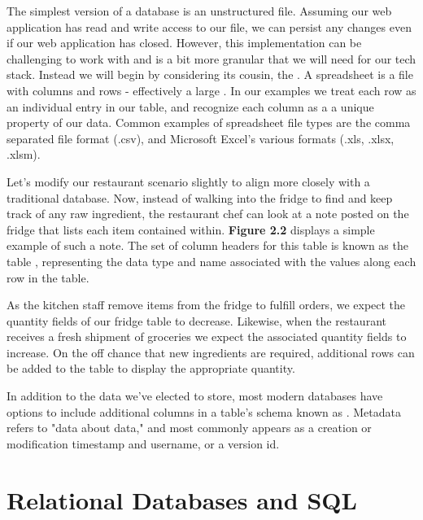 The simplest version of a database is an unstructured file. Assuming our web application has read and write access to our file, we can persist any changes even if our web application has closed. However, this implementation can be challenging to work with and is a bit more granular that we will need for our tech stack. Instead we will begin by considering its cousin, the . A spreadsheet is a file with columns and rows - effectively a large . In our examples we treat each row as an individual entry in our table, and recognize each column as a a unique property of our data. Common examples of spreadsheet file types are the comma separated file format (.csv), and Microsoft Excel's various formats (.xls, .xlsx, .xlsm).


Let's modify our restaurant scenario slightly to align more closely with a traditional database. Now, instead of walking into the fridge to find and keep track of any raw ingredient, the restaurant chef can look at a note posted on the fridge that lists each item contained within. \textbf{Figure 2.2} displays a simple example of such a note. The set of column headers for this table is known as the table , representing the data type and name associated with the values along each row in the table.

As the kitchen staff remove items from the fridge to fulfill orders, we expect the quantity fields of our fridge table to decrease. Likewise, when the restaurant receives a fresh shipment of groceries we expect the associated quantity fields to increase. On the off chance that new ingredients are required, additional rows can be added to the table to display the appropriate quantity. 


In addition to the data we've elected to store, most modern databases have options to include additional columns in a table's schema known as . Metadata refers to "data about data," and most commonly appears as a creation or modification timestamp and username, or a version id. 

\section{Relational Databases and SQL}

